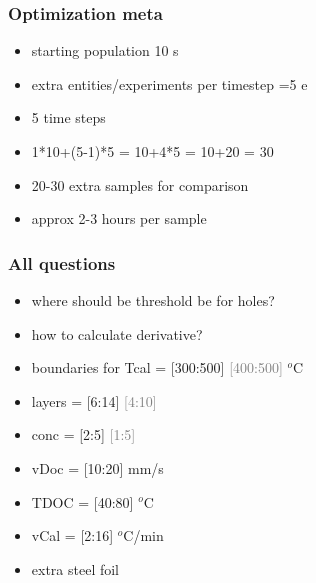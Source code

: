 \documentclass{beamer}
\newcommand{\me}[1]{\textcolor{gray}{#1}}
\begin{document}
\begin{frame}
	\frametitle{Optimization meta}
	\begin{itemize}
		\item starting population 10 s
		\item extra entities/experiments per timestep =5 e
		\item 5 time steps 
		\item 1*10+(5-1)*5 = 10+4*5 = 10+20 = 30
		\item 20-30 extra samples for comparison
		\item approx 2-3 hours per sample
	\end{itemize}
\end{frame}


\begin{frame}
	\frametitle{All questions}
	\begin{itemize}
		\item where should be threshold be for holes?
		\item how to calculate derivative?
		\item boundaries for Tcal = [300:500] \me{[400:500]} $^o$C
		\item layers  = [6:14] \me{[4:10]} 
		\item conc = [2:5] \me{[1:5]}
		\item vDoc = [10:20] mm/s
		\item TDOC = [40:80] $^o$C
		\item vCal = [2:16] $^o$C/min
		\item extra steel foil
	\end{itemize}
\end{frame}

\end{document}
